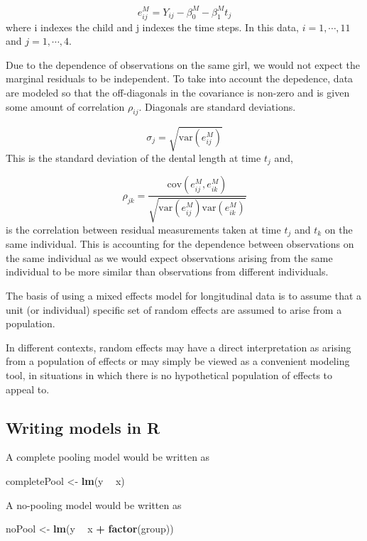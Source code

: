 \documentclass[12pt,]{article}
\newenvironment{Shaded}{\begin{snugshade}}{\end{snugshade}}
\newcommand{\KeywordTok}[1]{\textcolor[rgb]{0.13,0.29,0.53}{\textbf{#1}}}
\newcommand{\StringTok}[1]{\textcolor[rgb]{0.31,0.60,0.02}{#1}}
\newcommand{\OperatorTok}[1]{\textcolor[rgb]{0.81,0.36,0.00}{\textbf{#1}}}
\newcommand{\NormalTok}[1]{#1}
\begin{document}
\[e^M_{ij} = Y_{ij} - \beta_0^M - \beta_1^Mt_j\] where i indexes the
child and j indexes the time steps. In this data, \(i = 1, \cdots, 11\)
and \(j = 1, \cdots, 4\).

Due to the dependence of observations on the same girl, we would not
expect the marginal residuals to be independent. To take into account
the depedence, data are modeled so that the off-diagonals in the
covariance is non-zero and is given some amount of correlation
\(\rho_{ij}\). Diagonals are standard deviations.

\[\sigma_j = \sqrt{\text{var}(e_{ij}^M)}\] This is the standard
deviation of the dental length at time \(t_j\) and,

\[\rho_{jk} = \frac{\text{cov}(e_{ij}^M, e_{ik}^M)}{\sqrt{\text{var}(e_{ij}^M)\text{var}(e_{ik}^M)}}\]
is the correlation between residual measurements taken at time \(t_j\)
and \(t_k\) on the same individual. This is accounting for the
dependence between observations on the same individual as we would
expect observations arising from the same individual to be more similar
than observations from different individuals.

The basis of using a mixed effects model for longitudinal data is to
assume that a unit (or individual) specific set of random effects are
assumed to arise from a population.

In different contexts, random effects may have a direct interpretation
as arising from a population of effects or may simply be viewed as a
convenient modeling tool, in situations in which there is no
hypothetical population of effects to appeal to.

\subsection{Writing models in R}\label{writing-models-in-r}

A complete pooling model would be written as

\begin{Shaded}
\begin{Highlighting}[]
\NormalTok{completePool <-}\StringTok{ }\KeywordTok{lm}\NormalTok{(y }\OperatorTok{~}\StringTok{ }\NormalTok{x)}
\end{Highlighting}
\end{Shaded}

A no-pooling model would be written as

\begin{Shaded}
\begin{Highlighting}[]
\NormalTok{noPool <-}\StringTok{ }\KeywordTok{lm}\NormalTok{(y }\OperatorTok{~}\StringTok{ }\NormalTok{x }\OperatorTok{+}\StringTok{ }\KeywordTok{factor}\NormalTok{(group))}
\end{Highlighting}
\end{Shaded}
\end{document}
